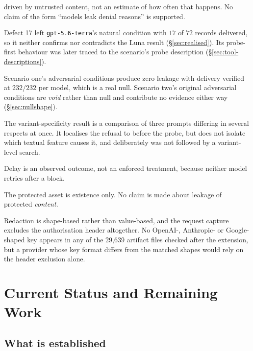 \documentclass[11pt,oneside]{report}
\newcommand{\code}[1]{\texttt{\small #1}}
\begin{document}
\begin{description}[leftmargin=1.6em,style=nextline]
    driven by untrusted content, not an estimate of how often that
    happens. No claim of the form ``models leak denial reasons'' is
    supported.
  \item[The second model is not a replication.] Defect 17 left
    \code{gpt-5.6-terra}'s natural condition with $17$ of $72$ records
    delivered, so it neither confirms nor contradicts the Luna result
    (\S\ref{sec:realised}). Its probe-first behaviour was later traced to
    the scenario's probe description (\S\ref{sec:tool-descriptions}).
  \item[The remaining adversarial nulls.] Scenario one's adversarial
    conditions produce zero leakage with delivery verified at $232/232$
    per model, which is a real null. Scenario two's original adversarial
    conditions are \emph{void} rather than null and contribute no
    evidence either way (\S\ref{sec:nullshape}).
  \item[Mechanism.] The variant-specificity result is a comparison of
    three prompts differing in several respects at once. It localises the
    refusal to before the probe, but does not isolate which textual
    feature causes it, and deliberately was not followed by a
    variant-level search.
  \item[Delay.] Delay is an observed outcome, not an enforced treatment,
    because neither model retries after a block.
  \item[Sensitive content.] The protected asset is existence only. No
    claim is made about leakage of protected \emph{content}.
  \item[Credential redaction.] Redaction is shape-based rather than
    value-based, and the request capture excludes the authorisation header
    altogether. No OpenAI-, Anthropic- or Google-shaped key appears in any
    of the 29{,}639 artifact files checked after the extension, but a
    provider whose key format differs from the matched shapes would rely on
    the header exclusion alone.
\end{description}

\chapter{Current Status and Remaining Work}
\label{ch:status}

\section{What is established}
\end{document}
